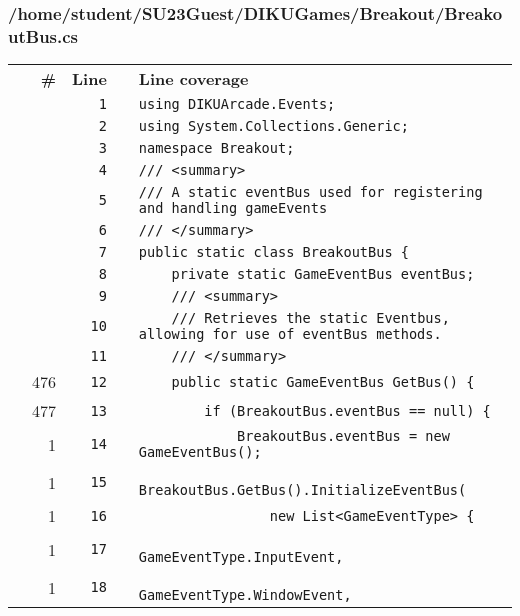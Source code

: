 \documentclass[a4paper,landscape,10pt]{article}
\begin{document}
\subsubsection{/home/student/SU23Guest/DIKUGames/Breakout/BreakoutBus.cs}
\begin{longtable}[l]{lrrll}
\textbf{} & \textbf{\#} & \textbf{Line} & \textbf{} & \textbf{Line coverage}\\
\cellcolor{gray} &  & \verb~1~ & & \verb~using DIKUArcade.Events;~\\
\cellcolor{gray} &  & \verb~2~ & & \verb~using System.Collections.Generic;~\\
\cellcolor{gray} &  & \verb~3~ & & \verb~namespace Breakout;~\\
\cellcolor{gray} &  & \verb~4~ & & \verb~/// <summary>~\\
\cellcolor{gray} &  & \verb~5~ & & \verb~/// A static eventBus used for registering and handling gameEvents~\\
\cellcolor{gray} &  & \verb~6~ & & \verb~/// </summary>~\\
\cellcolor{gray} &  & \verb~7~ & & \verb~public static class BreakoutBus {~\\
\cellcolor{gray} &  & \verb~8~ & & \verb~    private static GameEventBus eventBus;~\\
\cellcolor{gray} &  & \verb~9~ & & \verb~    /// <summary>~\\
\cellcolor{gray} &  & \verb~10~ & & \verb~    /// Retrieves the static Eventbus, allowing for use of eventBus methods.~\\
\cellcolor{gray} &  & \verb~11~ & & \verb~    /// </summary>~\\
\cellcolor{green} & 476 & \verb~12~ & & \verb~    public static GameEventBus GetBus() {~\\
\cellcolor{green} & 477 & \verb~13~ & & \verb~        if (BreakoutBus.eventBus == null) {~\\
\cellcolor{green} & 1 & \verb~14~ & & \verb~            BreakoutBus.eventBus = new GameEventBus();~\\
\cellcolor{green} & 1 & \verb~15~ & & \verb~            BreakoutBus.GetBus().InitializeEventBus(~\\
\cellcolor{green} & 1 & \verb~16~ & & \verb~                new List<GameEventType> {~\\
\cellcolor{green} & 1 & \verb~17~ & & \verb~                    GameEventType.InputEvent,~\\
\cellcolor{green} & 1 & \verb~18~ & & \verb~                    GameEventType.WindowEvent,~\\

\end{longtable}
\end{document}

